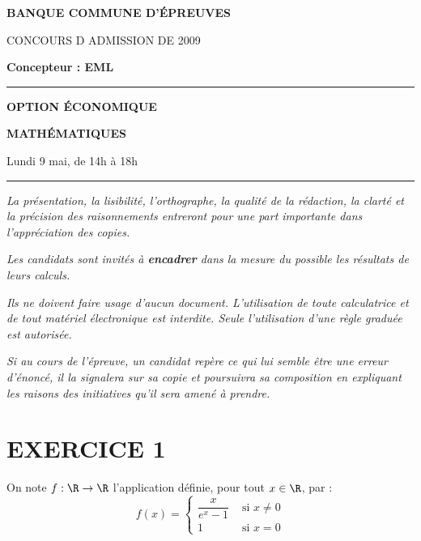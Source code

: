 \documentclass[11pt]{article}%
\begin{document}

\begin{center}
{\LARG\E\textbf{BANQUE COMMUNE D'ÉPREUVES}}



{\large \textsc{CONCOURS D ADMISSION DE 2009}}



{\large \textbf{Concepteur : EML}}



\rule{2.39cm}{0.05cm}



{\Large \textbf{OPTION ÉCONOMIQUE}}



{\Large \textbf{MATHÉMATIQUES }}



{\Large Lundi 9 mai, de 14h à 18h}



\rule{2.39cm}{0.05cm}
\end{center}

\textit{La présentation, la lisibilité, l'orthographe, la qualité
de la rédaction, la clarté et la précision des raisonnements
entreront pour une part importante dans l'appréciation des copies.}

\textit{Les candidats sont invités à \textbf{encadrer} dans la mesure
du possible les résultats de leurs calculs.}

\textit{Ils ne doivent faire usage d'aucun document. L'utilisation de
toute
calculatrice et de tout matériel électronique est interdite. Seule
l'utilisation d'une règle graduée est autorisée.}

\textit{Si au cours de l'épreuve, un candidat repère ce qui lui semble
être une erreur d'énoncé, il la signalera sur sa copie et
poursuivra sa composition en expliquant les raisons des initiatives
qu'il sera
amené à prendre.}

\vspace*{3cm}

\section*{EXERCICE 1}

On note $f :\R\rightarrow \R$ l'application définie, pour
tout $x\in \R$, par : 
\[
f\left( x\right) = \left\{ 
\begin{array}{cc}
\dfrac{x}{e^{x}-1} & \text{ si }x\neq 0 \\
1 & \text{ si }x = 0
\end{array}
\right. 
\]
\end{document}
